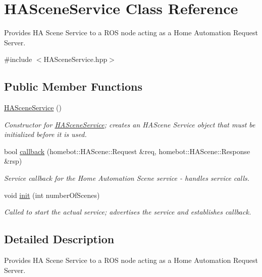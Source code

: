 \hypertarget{classHASceneService}{\section{H\-A\-Scene\-Service Class Reference}
\label{classHASceneService}
}


Provides H\-A Scene Service to a R\-O\-S node acting as a Home Automation Request Server.  




{\ttfamily \#include $<$H\-A\-Scene\-Service.\-hpp$>$}

\subsection*{Public Member Functions}
\begin{DoxyCompactItemize}
\item 
\hypertarget{classHASceneService_a7d0dc294d6f446fda905fb37c3de42da}{\hyperlink{classHASceneService_a7d0dc294d6f446fda905fb37c3de42da}{H\-A\-Scene\-Service} ()}\label{classHASceneService_a7d0dc294d6f446fda905fb37c3de42da}

\begin{DoxyCompactList}\small\item\em Constructor for \hyperlink{classHASceneService}{H\-A\-Scene\-Service}; creates an H\-A\-Scene Service object that must be initialized before it is used. \end{DoxyCompactList}\item 
bool \hyperlink{classHASceneService_a0422b927508ec812b9a4ab70d0fc349b}{callback} (homebot\-::\-H\-A\-Scene\-::\-Request \&req, homebot\-::\-H\-A\-Scene\-::\-Response \&rsp)
\begin{DoxyCompactList}\small\item\em Service callback for the Home Automation Scene service -\/ handles service calls. \end{DoxyCompactList}\item 
void \hyperlink{classHASceneService_a31dc3ff154500fe4d607f5114d01edcc}{init} (int number\-Of\-Scenes)
\begin{DoxyCompactList}\small\item\em Called to start the actual service; advertises the service and establishes callback. \end{DoxyCompactList}\end{DoxyCompactItemize}


\subsection{Detailed Description}
Provides H\-A Scene Service to a R\-O\-S node acting as a Home Automation Request Server. 

